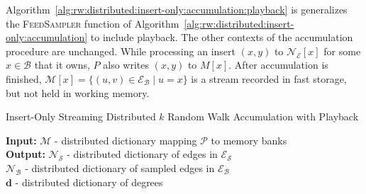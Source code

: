 \documentclass[10]{report}
\newcommand{\algoname}[1]{\textnormal{\textsc{#1}}}
\begin{document}
Algorithm~\ref{alg:rw:distributed:insert-only:accumulation:playback} is generalizes the \algoname{FeedSampler} function of Algorithm~\ref{alg:rw:distributed:insert-only:accumulation} to include playback.
The other contexts of the accumulation procedure are unchanged.
While processing an insert $(x, y)$ to $\mathcal{N}_\mathcal{E}[x]$ for some $x \in \mathcal{B}$ that it owns, $P$ also writes $(x,y)$ to $M[x]$.
After accumulation is finished, $\mathcal{M}[x] = \{ (u, v) \in \mathcal{E}_\mathcal{B} \mid u = x\}$ is a stream recorded in fast storage, but not held in working memory.

\begin{algorithm}[htbp] 
\caption{Insert-Only Streaming Distributed $k$ Random Walk Accumulation with Playback}\label{alg:rw:distributed:insert-only:accumulation:playback}
\begin{flushleft}
        \textbf{Input:} 		%
        		$\mathcal{M}$ - distributed dictionary mapping $\mathcal{P}$ to memory banks	 \\
        \textbf{Output:} $\mathcal{N}_\mathcal{S}$ - distributed dictionary of edges in $\mathcal{E}_\mathcal{S}$ \\
        	\hspace{4.05em}	$\mathcal{N}_\mathcal{B}$ - distributed dictionary of sampled edges in $\mathcal{E}_\mathcal{B}$ \\
        	\hspace{4.05em}	$\mathbf{d}$ - distributed dictionary of degrees

\end{flushleft}
\end{algorithm}
\end{document}
